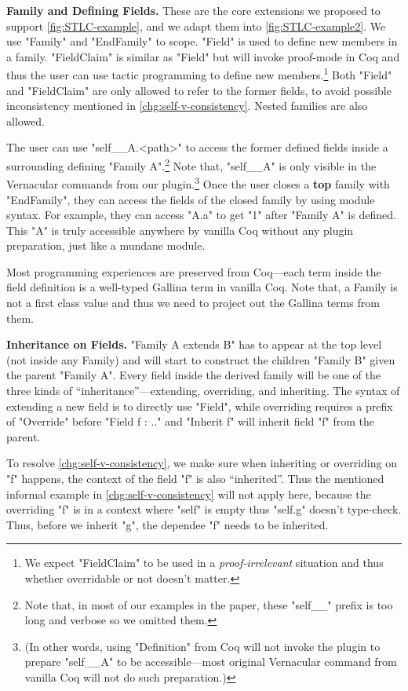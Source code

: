 \textbf{Family and Defining Fields.} These are the core extensions we proposed to support \cref{fig:STLC-example}, and we adapt them into \cref{fig:STLC-example2}. We use "Family" and "EndFamily" to scope. "Field" is used to define new members in a family. "FieldClaim" is similar as "Field" but will invoke proof-mode in Coq and thus the user can use tactic programming to define new members.\footnote{We expect "FieldClaim" to be used in a \textit{proof-irrelevant} situation and thus whether overridable or not doesn't matter.} Both "Field" and "FieldClaim" are only allowed to refer to the former fields, to avoid possible inconsistency mentioned in \ref{chg:self-v-consistency}.
Nested families are also allowed. 


The user can use "self__A.<path>" to access the former defined fields inside a surrounding defining "Family A".\footnote{Note that, in most of our examples in the paper, these "self__" prefix is too long and verbose so we omitted them.} Note that, "self__A" is only visible in the Vernacular commands from our plugin.\footnote{(In other words, using "Definition" from Coq will not invoke the plugin to prepare "self__A" to be accessible---most original Vernacular command from vanilla Coq will not do such preparation.)}  Once the user closes a \textbf{top} family with "EndFamily", they can access the fields of the closed family by using module syntax. For example, they can access "A.a" to get "1" after "Family A" is defined. This "A" is truly accessible anywhere by vanilla Coq without any plugin preparation, just like a mundane module.

Most programming experiences are preserved from Coq---each term inside the field definition is a well-typed Gallina term in vanilla Coq. Note that, a Family is not a first class value and thus we need to project out the Gallina terms from them.

\textbf{Inheritance on Fields.} "Family A extends B" has to appear at
the top level (not inside any Family) and will start to construct the
children "Family B" given the parent "Family A". Every field inside the
derived family will be one of the three kinds of
``inheritance''---extending, overriding, and inheriting.
The syntax of extending a new field is to directly use "Field", while
overriding requires a prefix of "Override" before "Field f : .." and
"Inherit f" will inherit field "f" from the parent. 

To resolve \ref{chg:self-v-consistency}, we make sure when inheriting or
overriding on "f" happens, the context of the field "f" is also
``inherited''. Thus the mentioned informal example in
\ref{chg:self-v-consistency} will not apply here, because the overriding "f" is
in a context where "self" is empty thus "self.g" doesn't
type-check. Thus, before we inherit "g", the dependee "f" needs to be
inherited.  



